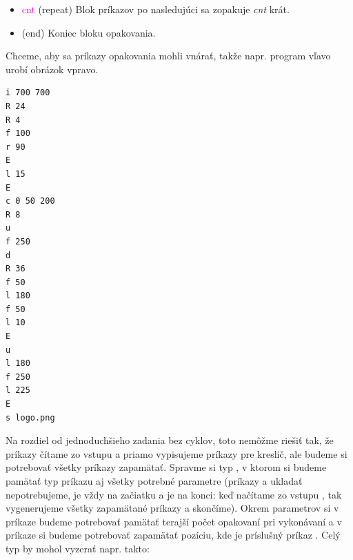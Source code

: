 {\em
\def\tmp{\item \textcolor{magenta}}  
\begin{itemize}\itemsep=-1mm
      \tmp{ cnt} (repeat) Blok príkazov po nasledujúci  sa zopakuje
      {\em cnt} krát.
    \tmp{} (end) Koniec bloku opakovania.
\end{itemize}
}


Chceme, aby sa príkazy opakovania mohli vnárať, takže napr. program vľavo
urobí obrázok vpravo.

\begin{minipage}[t]{0.3\textwidth}\vspace{0pt}
\begin{Verbatim}
i 700 700
R 24
R 4
f 100
r 90
E
l 15
E
c 0 50 200
R 8
u
f 250
d
R 36
f 50
l 180
f 50
l 10
E
u
l 180
f 250
l 225
E
s logo.png
\end{Verbatim}
\end{minipage}
\hfill
\begin{minipage}[t]{0.7\textwidth}
\end{minipage}


Na rozdiel od jednoduchšieho zadania bez cyklov, toto nemôžme riešiť tak, že 
príkazy čítame zo vstupu a priamo
vypisujeme príkazy pre kreslič, ale budeme si potrebovať všetky príkazy zapamätať.
Spravme si typ , v ktorom si budeme pamätať typ príkazu aj všetky
potrebné parametre (príkazy  a  ukladať nepotrebujeme,  je vždy
na začiatku a  je na konci: keď načítame zo vstupu , tak vygenerujeme
všetky zapamätané príkazy a skončíme). Okrem parametrov si v príkaze
 budeme potrebovať pamätať terajší počet opakovaní pri vykonávaní 
a v príkaze  si budeme potrebovať zapamätať pozíciu, kde je príslušný
príkaz . Celý typ by mohol vyzerať napr. takto:\\


